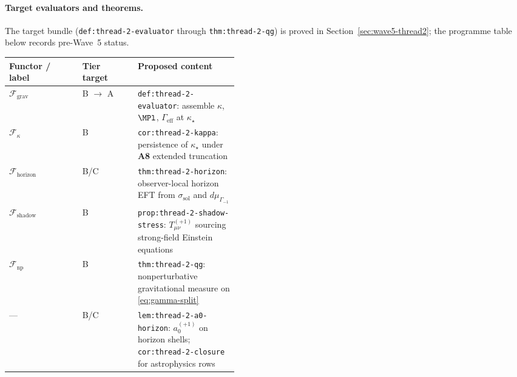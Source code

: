 \paragraph{Target evaluators and theorems.}
The target bundle
(\texttt{def:thread-2-evaluator} through \texttt{thm:thread-2-qg}) is proved in
Section~\ref{sec:wave5-thread2}; the programme table below records pre-Wave~5
status.
\begin{center}
\small
\renewcommand{\arraystretch}{1.12}
\begin{tabular}{@{}llp{0.44\linewidth}@{}}
\toprule
\textbf{Functor / label} & \textbf{Tier target} & \textbf{Proposed content} \\
\midrule
$\mathcal{F}_{\mathrm{grav}}$ &
  B $\to$ A &
  \texttt{def:thread-2-evaluator}: assemble $\kappa$, $\MPl$,
  $\Gamma_{\mathrm{eff}}$ at $\kappa_\star$ \\
$\mathcal{F}_{\kappa}$ &
  B &
  \texttt{cor:thread-2-kappa}: persistence of $\kappa_\star$ under
  \textbf{A8} extended truncation \\
$\mathcal{F}_{\mathrm{horizon}}$ &
  B/C &
  \texttt{thm:thread-2-horizon}: observer-local horizon EFT from
  $\sigma_{\mathrm{sol}}$ and $d\mu_{\Gamma_{-1}}$ \\
$\mathcal{F}_{\mathrm{shadow}}$ &
  B &
  \texttt{prop:thread-2-shadow-stress}: $T_{\mu\nu}^{(+1)}$ sourcing
  strong-field Einstein equations \\
$\mathcal{F}_{\mathrm{np}}$ &
  B &
  \texttt{thm:thread-2-qg}: nonperturbative gravitational measure on
  \eqref{eq:gamma-split} \\
--- &
  B/C &
  \texttt{lem:thread-2-a0-horizon}: $a_0^{(+1)}$ on horizon shells;
  \texttt{cor:thread-2-closure} for astrophysics rows \\
\bottomrule
\end{tabular}
\end{center}

